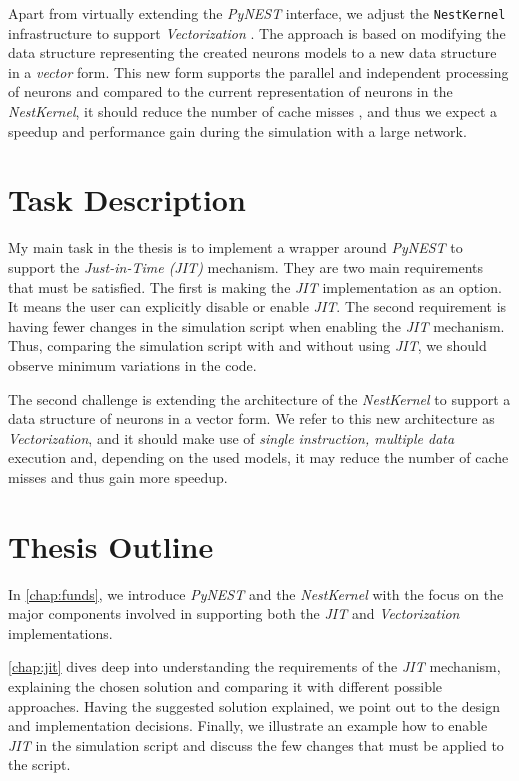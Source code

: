
Apart from virtually extending the \emph{PyNEST} interface, we adjust the \texttt{NestKernel} infrastructure to support \emph{Vectorization} \citep{nuzman2006auto}. The approach is based on modifying the data structure representing the created neurons models to a new data structure in a \emph{vector} form. This new form supports the parallel and independent processing of neurons and compared to the current representation of neurons in the \emph{NestKernel}, it should reduce the number of cache misses \citep{ghosh1997cache}, and thus we expect a speedup and performance gain during the simulation with a large network.

\section{Task Description}
My main task in the thesis is to implement a wrapper around \emph{PyNEST} to support the \emph{Just-in-Time (JIT)} mechanism. They are two main requirements that must be satisfied. The first is making the \emph{JIT} implementation as an option. It means the user can explicitly disable or enable \emph{JIT}. The second requirement is having fewer changes in the simulation script when enabling the \emph{JIT} mechanism. Thus, comparing the simulation script with and without using \emph{JIT}, we should observe minimum variations in the code.

The second challenge is extending the architecture of the \emph{NestKernel} to support a data structure of neurons in a vector form. We refer to this new architecture as \emph{Vectorization}, and it should make use of \emph{single instruction, multiple data} execution and, depending on the used models, it may reduce the number of cache misses and thus gain more speedup.
\section{Thesis Outline}


In \autoref{chap:funds}, we introduce \emph{PyNEST} and the \emph{NestKernel} with the focus on the major components involved in supporting both the \emph{JIT} and \emph{Vectorization} implementations.

\autoref{chap:jit} dives deep into understanding the requirements of the \emph{JIT} mechanism, explaining the chosen solution and comparing it with different possible approaches. Having the suggested solution explained, we point out to the design and implementation decisions. Finally, we illustrate an example how to enable \emph{JIT} in the simulation script and discuss the few changes that must be applied to the script.

